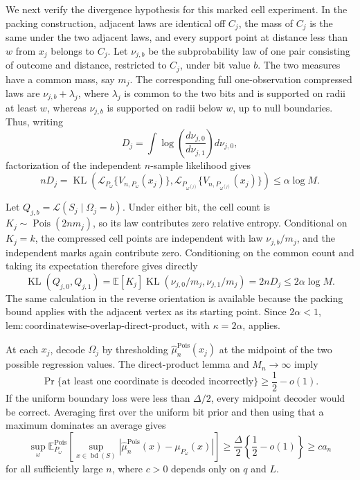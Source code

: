 We next verify the divergence hypothesis for this marked cell experiment.  In the packing construction, adjacent laws are identical off \(C_j\), the mass of \(C_j\) is the same under the two adjacent laws, and every support point at distance less than \(w\) from \(x_j\) belongs to \(C_j\).  Let \(\nu_{j,b}\) be the subprobability law of one pair consisting of outcome and distance, restricted to \(C_j\), under bit value \(b\).  The two measures have a common mass, say \(m_j\).  The corresponding full one-observation compressed laws are \(\nu_{j,b}+\lambda_j\), where \(\lambda_j\) is common to the two bits and is supported on radii at least \(w\), whereas \(\nu_{j,b}\) is supported on radii below \(w\), up to null boundaries.  Thus, writing
\[
 D_j=\int\log\!\left(\frac{d\nu_{j,0}}{d\nu_{j,1}}\right)d\nu_{j,0},
\]
factorization of the independent \(n\)-sample likelihood gives
\[
 nD_j
 =\operatorname{KL}\!\left(
 \mathcal L_{P_\omega}\{V_{n,P_\omega}(x_j)\},
 \mathcal L_{P_{\omega^{(j)}}}\{V_{n,P_{\omega^{(j)}}}(x_j)\}
 \right)
 \leq\alpha\log M.
\]

Let \(Q_{j,b}=\mathcal L(S_j\mid\Omega_j=b)\).  Under either bit, the cell count is \(K_j\sim\operatorname{Pois}(2nm_j)\), so its law contributes zero relative entropy.  Conditional on \(K_j=k\), the compressed cell points are independent with law \(\nu_{j,b}/m_j\), and the independent marks again contribute zero.  Conditioning on the common count and taking its expectation therefore gives directly
\[
 \operatorname{KL}(Q_{j,0},Q_{j,1})
 =\mathbb E[K_j]\operatorname{KL}(\nu_{j,0}/m_j,\nu_{j,1}/m_j)
 =2nD_j
 \leq2\alpha\log M.
\]
The same calculation in the reverse orientation is available because the packing bound applies with the adjacent vertex as its starting point.  Since \(2\alpha<1\), \(\mathrm{lem:coordinatewise\text{-}overlap\text{-}direct\text{-}product}\), with \(\kappa=2\alpha\), applies.

At each \(x_j\), decode \(\Omega_j\) by thresholding \(\widehat\mu_n^{\mathrm{Pois}}(x_j)\) at the midpoint of the two possible regression values.  The direct-product lemma and \(M_n\to\infty\) imply
\[
 \Pr\{\text{at least one coordinate is decoded incorrectly}\}
 \geq\frac12-o(1).
\]
If the uniform boundary loss were less than \(\Delta/2\), every midpoint decoder would be correct.  Averaging first over the uniform bit prior and then using that a maximum dominates an average gives
\[
 \sup_\omega
 \mathbb E_{P_\omega}^{\mathrm{Pois}}\!\left[
 \sup_{x\in\operatorname{bd}(S)}
 |\widehat\mu_n^{\mathrm{Pois}}(x)-\mu_{P_\omega}(x)|
 \right]
 \geq\frac{\Delta}{2}\left\{\frac12-o(1)\right\}
 \geq c a_n
\]
for all sufficiently large \(n\), where \(c>0\) depends only on \(q\) and \(L\).

